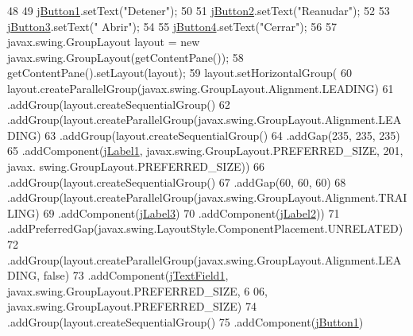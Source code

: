 \begin{DoxyCode}
48  
49         \mbox{\hyperlink{classpa__sesion6_1_1_prog_principal_ac3fa4d920e564a95291a07710b145455}{jButton1}}.setText(\textcolor{stringliteral}{"Detener"});
50  
51         \mbox{\hyperlink{classpa__sesion6_1_1_prog_principal_a124fb4257898d5e460eed588be9d285c}{jButton2}}.setText(\textcolor{stringliteral}{"Reanudar"});
52  
53         \mbox{\hyperlink{classpa__sesion6_1_1_prog_principal_ab47a77238e53b4e0e6d1d5cd5d83620d}{jButton3}}.setText(\textcolor{stringliteral}{" Abrir"});
54  
55         \mbox{\hyperlink{classpa__sesion6_1_1_prog_principal_a9703d219be4d93bd1f6ed81cbfc1af61}{jButton4}}.setText(\textcolor{stringliteral}{"Cerrar"});
56  
57         javax.swing.GroupLayout layout = \textcolor{keyword}{new} javax.swing.GroupLayout(getContentPane());
58         getContentPane().setLayout(layout);
59         layout.setHorizontalGroup(
60             layout.createParallelGroup(javax.swing.GroupLayout.Alignment.LEADING)
61             .addGroup(layout.createSequentialGroup()
62                 .addGroup(layout.createParallelGroup(javax.swing.GroupLayout.Alignment.LEADING)
63                     .addGroup(layout.createSequentialGroup()
64                         .addGap(235, 235, 235)
65                         .addComponent(\mbox{\hyperlink{classpa__sesion6_1_1_prog_principal_a52f639c7e833b4a261a9de20d1bb8e80}{jLabel1}}, javax.swing.GroupLayout.PREFERRED\_SIZE, 201, javax.
      swing.GroupLayout.PREFERRED\_SIZE))
66                     .addGroup(layout.createSequentialGroup()
67                         .addGap(60, 60, 60)
68                         .addGroup(layout.createParallelGroup(javax.swing.GroupLayout.Alignment.TRAILING)
69                             .addComponent(\mbox{\hyperlink{classpa__sesion6_1_1_prog_principal_a4531dd28f71269d0ecd682e0c8f6cc2e}{jLabel3}})
70                             .addComponent(\mbox{\hyperlink{classpa__sesion6_1_1_prog_principal_a43bcbbe1661eb5a6c1cbc52e7f15ef96}{jLabel2}}))
71                         .addPreferredGap(javax.swing.LayoutStyle.ComponentPlacement.UNRELATED)
72                         .addGroup(layout.createParallelGroup(javax.swing.GroupLayout.Alignment.LEADING, \textcolor{keyword}{
      false})
73                             .addComponent(\mbox{\hyperlink{classpa__sesion6_1_1_prog_principal_a1b336bc5700d2300c7c85f594b2a67c5}{jTextField1}}, javax.swing.GroupLayout.PREFERRED\_SIZE, 6
      06, javax.swing.GroupLayout.PREFERRED\_SIZE)
74                             .addGroup(layout.createSequentialGroup()
75                                 .addComponent(\mbox{\hyperlink{classpa__sesion6_1_1_prog_principal_ac3fa4d920e564a95291a07710b145455}{jButton1}})

\end{DoxyCode}
